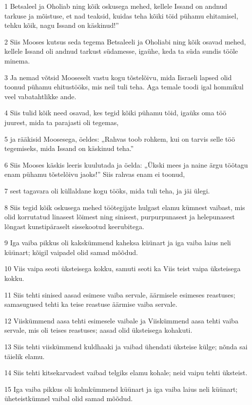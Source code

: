 \par 1 Betsaleel ja Oholiab ning kõik oskusega mehed, kellele Issand on andnud tarkuse ja mõistuse, et nad teaksid, kuidas teha kõiki töid pühamu ehitamisel, tehku kõik, nagu Issand on käskinud!”
\par 2 Siis Mooses kutsus seda tegema Betsaleeli ja Oholiabi ning kõik osavad mehed, kellele Issand oli andnud tarkust südamesse, igaühe, keda ta süda sundis tööle minema.
\par 3 Ja nemad võtsid Mooseselt vastu kogu tõstelõivu, mida Iisraeli lapsed olid toonud pühamu ehitustööks, mis neil tuli teha. Aga temale toodi igal hommikul veel vabatahtlikke ande.
\par 4 Siis tulid kõik need osavad, kes tegid kõiki pühamu töid, igaüks oma töö juurest, mida ta parajasti oli tegemas,
\par 5 ja rääkisid Moosesega, öeldes: „Rahvas toob rohkem, kui on tarvis selle töö tegemiseks, mida Issand on käskinud teha.”
\par 6 Siis Mooses käskis leeris kuulutada ja öelda: „Ükski mees ja naine ärgu töötagu enam pühamu tõstelõivu jaoks!” Siis rahvas enam ei toonud,
\par 7 sest tagavara oli küllaldane kogu tööks, mida tuli teha, ja jäi ülegi.
\par 8 Siis tegid kõik oskusega mehed töötegijate hulgast elamu kümnest vaibast, mis olid korrutatud linasest lõimest ning sinisest, purpurpunasest ja helepunasest lõngast kunstipäraselt sissekootud keerubitega.
\par 9 Iga vaiba pikkus oli kakskümmend kaheksa küünart ja iga vaiba laius neli küünart; kõigil vaipadel olid samad mõõdud.
\par 10 Viis vaipa seoti üksteisega kokku, samuti seoti ka Viis teist vaipa üksteisega kokku.
\par 11 Siis tehti sinised aasad esimese vaiba servale, äärmisele esimeses reastuses; samasugused tehti ka teise reastuse äärmise vaiba servale.
\par 12 Viiskümmend aasa tehti esimesele vaibale ja Viiskümmend aasa tehti vaiba servale, mis oli teises reastuses; aasad olid üksteisega kohakuti.
\par 13 Siis tehti viiskümmend kuldhaaki ja vaibad ühendati üksteise külge; nõnda sai täielik elamu.
\par 14 Siis tehti kitsekarvadest vaibad telgiks elamu kohale; neid vaipu tehti üksteist.
\par 15 Iga vaiba pikkus oli kolmkümmend küünart ja iga vaiba laius neli küünart; üheteistkümnel vaibal olid samad mõõdud.
